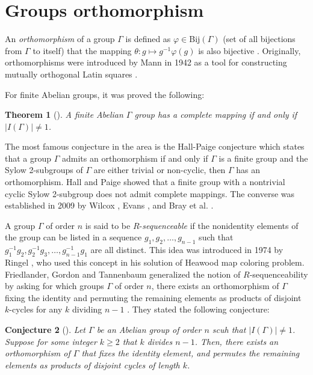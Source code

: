 \documentclass{article}
\newtheorem{thm}{Theorem}[section]
\newtheorem{conj}[thm]{Conjecture}
\begin{document}
\section{Groups orthomorphism}
An \textit{orthomorphism} of a group $\Gamma$ is defined
as $\varphi\in$Bij$(\Gamma)$ (set of all bijections from $\Gamma$ to itself) that the mapping  $\theta\colon g \mapsto  g^{-1}\varphi(g)$ is
also bijective \cite{Hall}. 
Originally, orthomorphisms were introduced by Mann in 1942 as a tool for constructing mutually orthogonal Latin squares  \cite{Mann}. 

For finite Abelian groups, it was proved the following:
\begin{thm}[\cite{Hall,HP}]
A finite Abelian $\Gamma$ group has a complete
mapping if and only if $|I(\Gamma)|\neq1$.
\end{thm}
The most famous conjecture in the area is the Hall-Paige conjecture \cite{HP} which states that a group $\Gamma$ admits an orthomorphism if and
only if  $ \Gamma$ is a finite group and the Sylow 2-subgroups of $ \Gamma $ are either trivial or non-cyclic, then $ \Gamma $ has an orthomorphism.   Hall and Paige showed that a finite group with a nontrivial cyclic Sylow 2-subgroup does not admit complete mappings. The converse was established in 2009 by Wilcox 
\cite{Wilcox}, Evans \cite{Evans}, and Bray et al. \cite{Bray}.

A group $\Gamma$ of order $n$ is said to be $R$-\textit{sequenceable} if the nonidentity elements of the group can be listed in a sequence $g_1, g_2,\ldots, g_{n-1}$ such that  $g_1^{-1}g_2, g_2^{-1}g_3,\ldots, g_{n-1}^{-1}g_1$ are all distinct. This idea was introduced in  1974 by Ringel \cite{Ringel}, who used this concept in his solution of Heawood map coloring problem. Friedlander, Gordon and Tannenbaum generalized the notion of $R$-sequenceability by asking for which groups $\Gamma$ of order $n$, there exists an orthomorphism of $\Gamma$ fixing the identity and permuting the remaining elements as products of disjoint $k$-cycles for any $k$ dividing $n-1$ \cite{FrieGorTan}.
They stated the following conjecture:
\begin{conj}[\cite{FrieGorTan}] Let $\Gamma$ be an Abelian group of order $n$ scuh that $|I(\Gamma)|\neq 1$. Suppose for some integer $k \geq 2$ that $k$ divides $n - 1$. Then, there exists
an orthomorphism of $\Gamma$ that fixes the identity element, and permutes the remaining elements as products of disjoint cycles of length $k$.
\end{conj}
\end{document}
